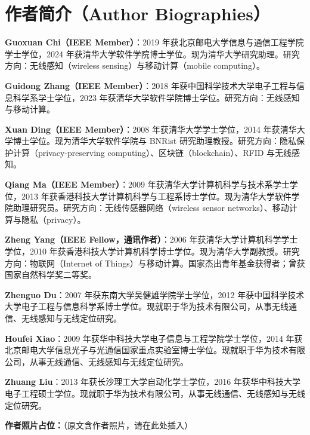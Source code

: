 \documentclass[UTF8,twocolumn]{ctexart}
\begin{document}
\section*{作者简介（Author Biographies）}
\noindent\textbf{Guoxuan Chi（IEEE Member）}：2019 年获北京邮电大学信息与通信工程学院学士学位，2024 年获清华大学软件学院博士学位。现为清华大学研究助理。研究方向：无线感知（wireless sensing）与移动计算（mobile computing）。

\noindent\textbf{Guidong Zhang（IEEE Member）}：2018 年获中国科学技术大学电子工程与信息科学系学士学位，2023 年获清华大学软件学院博士学位。研究方向：无线感知与移动计算。

\noindent\textbf{Xuan Ding（IEEE Member）}：2008 年获清华大学学士学位，2014 年获清华大学博士学位。现为清华大学软件学院与 BNRist 研究助理教授。研究方向：隐私保护计算（privacy-preserving computing）、区块链（blockchain）、RFID 与无线感知。

\noindent\textbf{Qiang Ma（IEEE Member）}：2009 年获清华大学计算机科学与技术系学士学位，2013 年获香港科技大学计算机科学与工程系博士学位。现为清华大学软件学院助理研究员。研究方向：无线传感器网络（wireless sensor networks）、移动计算与隐私（privacy）。

\noindent\textbf{Zheng Yang（IEEE Fellow，通讯作者）}：2006 年获清华大学计算机科学学士学位，2010 年获香港科技大学计算机科学博士学位。现为清华大学副教授。研究方向：物联网（Internet of Things）与移动计算。国家杰出青年基金获得者；曾获国家自然科学奖二等奖。

\noindent\textbf{Zhenguo Du}：2007 年获东南大学吴健雄学院学士学位，2012 年获中国科学技术大学电子工程与信息科学系博士学位。现就职于华为技术有限公司，从事无线通信、无线感知与无线定位研究。

\noindent\textbf{Houfei Xiao}：2009 年获华中科技大学电子信息与工程学院学士学位，2014 年获北京邮电大学信息光子与光通信国家重点实验室博士学位。现就职于华为技术有限公司，从事无线通信、无线感知与无线定位研究。

\noindent\textbf{Zhuang Liu}：2013 年获长沙理工大学自动化学士学位，2016 年获华中科技大学电子工程硕士学位。现就职于华为技术有限公司，从事无线通信、无线感知与无线定位研究。

\bigskip
\noindent\textbf{作者照片占位：}（原文含作者照片，请在此处插入）
\end{document}
